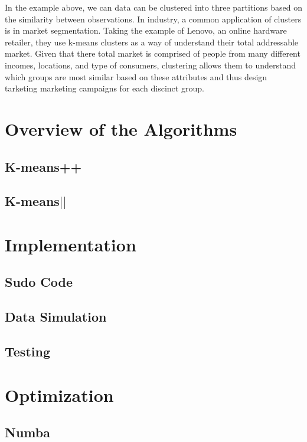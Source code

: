 \documentclass{article} %
\begin{document}
In the example above, we can data can be clustered into three partitions based on the similarity between observations. In industry, a common application of clusters is in market segmentation. Taking the example of Lenovo, an online hardware retailer, they use k-means clusters as a way of understand their total addressable market. Given that there total market is comprised of people from many different incomes, locations, and type of consumers, clustering allows them to understand which groups are most similar based on these attributes and thus design tarketing marketing campaigns for each discinct group. 



\section{Overview of the Algorithms}
\label{headings}

\subsection{K-means++}

\subsection{K-means$||$}

\section{Implementation}
\label{headings}

\subsection{Sudo Code}

\subsection{Data Simulation}

\subsection{Testing}

\section{Optimization}
\label{headings}

\subsection{Numba}
\end{document}
